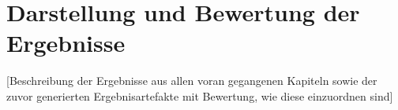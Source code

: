 \chapter{Darstellung und Bewertung der Ergebnisse}
[Beschreibung der Ergebnisse aus allen voran gegangenen Kapiteln sowie der zuvor generierten Ergebnisartefakte mit Bewertung, wie diese einzuordnen sind]

